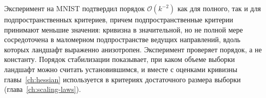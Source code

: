 Эксперимент на MNIST подтвердил порядок $\mathcal O(k^{-2})$ как для полного, так и для подпространственных критериев, причем подпространственные критерии принимают меньшие значения: кривизна в значительной, но не полной мере сосредоточена в маломерном подпространстве ведущих направлений, вдоль которых ландшафт выраженно анизотропен. Эксперимент проверяет порядок, а не константу. Порядок стабилизации показывает, при каком объеме выборки ландшафт можно считать установившимся, и вместе с оценками кривизны главы~\ref{ch:hessian} используется в критериях достаточного размера выборки (глава~\ref{ch:scaling-laws}).
